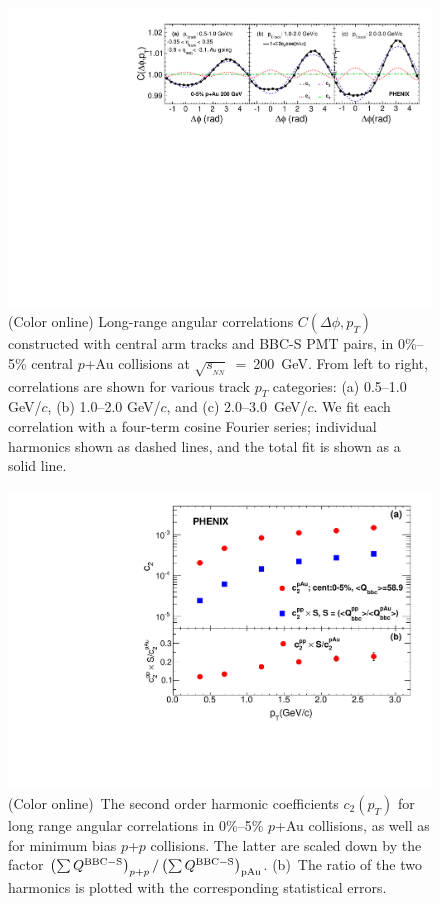 \documentclass[%
reprint,
showpacs,preprintnumbers,
 amsmath,amssymb,
 aps,
]{revtex4-1}
\newcommand{\pt}{\mbox{$p_T$}\xspace}
\newcommand{\sqsn}{\mbox{$\sqrt{s_{_{NN}}}$}\xspace}
\newcommand{\pau}{\mbox{$p$+Au}\xspace}
\newcommand{\pp}{\mbox{$p$+$p$}\xspace}
\begin{document}
\begin{figure}[htbp]
  \includegraphics[scale=0.8]{Figures/figure1.pdf}
  \caption{(Color online) Long-range angular correlations $C(\Delta\phi,p_{T})$ constructed with central arm tracks and BBC-S PMT pairs, in 0\%--5\% central \pau collisions at \sqsn~=~200~GeV. From left to right,
correlations are shown for various track \pt categories: (a) 0.5--1.0 GeV/$c$, (b) 1.0--2.0 GeV/$c$, and (c) 2.0--3.0~GeV/$c$. We fit each correlation with a four-term cosine Fourier series; individual harmonics shown as dashed lines, and the total fit is shown as a solid line.}
\label{fig:figure1}
\end{figure}

\begin{figure}[htbp]
  \includegraphics[scale=0.45]{Figures/figure2.pdf}
  \caption{(Color online)~The second order harmonic coefficients $c_2(p_T)$ for long range angular correlations in
0\%--5\% \pau collisions, as well as for minimum bias \pp collisions. The latter are scaled down by the factor $\left( \sum Q^{{\rm BBC-S}} \right)_{p+p} / \left( \sum Q^{{\rm
BBC-S}} \right)_{{\rm pAu}}$. (b)~The
ratio of the two harmonics is plotted with the corresponding statistical errors.
}
\label{fig:figure2}
\end{figure}
\end{document}
